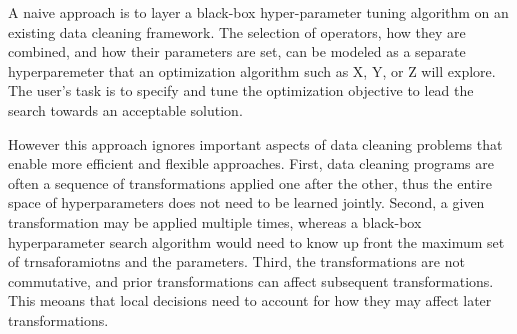 A naive approach is to layer a black-box hyper-parameter tuning algorithm on an existing data cleaning framework.  The selection of operators, how they are combined, and how their parameters are set, can be modeled as a separate hyperparemeter that an optimization algorithm such as X, Y, or Z will explore.  The user's task is to specify and tune the optimization objective to lead the search towards an acceptable solution.   

However this approach ignores important aspects of data cleaning problems that enable more efficient and flexible approaches.  First, data cleaning programs are often a sequence of transformations applied one after the other, thus the entire space of hyperparameters does not need to be learned jointly.  Second, a given transformation may be applied multiple times, whereas a black-box hyperparameter search algorithm would need to know up front the maximum set of trnsaforamiotns and the parameters. Third, the transformations are not commutative, and prior transformations can affect subsequent transformations.  This meoans that local decisions need to account for how they may affect later transformations.  








